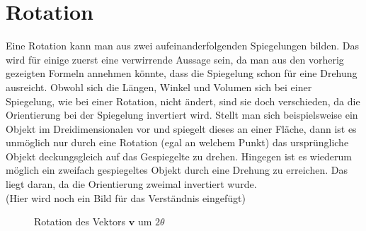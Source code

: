 %
%
%
\section{Rotation}

Eine Rotation kann man aus zwei aufeinanderfolgenden Spiegelungen bilden. Das wird für einige zuerst eine verwirrende Aussage sein, da man aus den vorherig gezeigten Formeln annehmen könnte, dass die Spiegelung schon für eine Drehung ausreicht. Obwohl sich die Längen, Winkel und Volumen sich bei einer Spiegelung, wie bei einer Rotation, nicht ändert, sind sie doch verschieden, da die Orientierung bei der Spiegelung invertiert wird. Stellt man sich beispielsweise ein Objekt im Dreidimensionalen vor und spiegelt dieses an einer Fläche, dann ist es unmöglich nur durch eine Rotation (egal an welchem Punkt) das ursprüngliche Objekt deckungsgleich auf das Gespiegelte zu drehen. Hingegen ist es wiederum möglich ein zweifach gespiegeltes Objekt durch eine Drehung zu erreichen. Das liegt daran, da die Orientierung zweimal invertiert wurde.
\\(Hier wird noch ein Bild für das Verständnis eingefügt)

\begin{figure}
	\centering
	\caption{Rotation des Vektors $\textbf{v}$ um $2\theta$}
	\label{BildRotation}
\end{figure}

